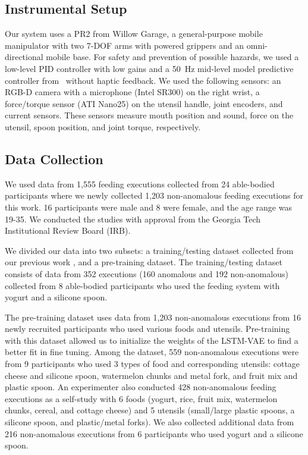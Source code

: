 \documentclass[letterpaper, 10 pt, conference]{ieeeconf}
\begin{document}
\subsection{Instrumental Setup}
Our system uses a PR2 from Willow Garage, a general-purpose mobile manipulator with two 7-DOF arms with powered grippers and an omni-directional mobile base. For safety and prevention of possible hazards, we used a low-level PID controller with low gains and a \SI{50}{\hertz} mid-level model predictive controller from~\cite{jain2013reaching} without haptic feedback. We used the following sensors: an RGB-D camera with a microphone (Intel SR300) on the right wrist, a force/torque sensor (ATI Nano25) on the utensil handle, joint encoders, and current sensors. These sensors measure mouth position and sound, force on the utensil, spoon position, and joint torque, respectively. 

\subsection{Data Collection}
We used data from 1,555 feeding executions collected from 24 able-bodied participants where we newly collected 1,203 non-anomalous feeding executions for this work. 16 participants were male and 8 were female, and the age range was 19-35. We conducted the studies with approval from the Georgia Tech Institutional Review Board (IRB).

We divided our data into two subsets: a training/testing dataset collected from our previous work \cite{park2017class}, and a pre-training dataset. The training/testing dataset consists of data from 352 executions (160 anomalous and 192 non-anomalous) collected from 8 able-bodied participants who used the feeding system with yogurt and a silicone spoon. 

The pre-training dataset uses data from 1,203 non-anomalous executions from 16 newly recruited participants who used various foods and utensils. Pre-training with this dataset allowed us to initialize the weights of the LSTM-VAE to find a better fit in fine tuning. Among the dataset, 559 non-anomalous executions were from 9 participants who used 3 types of food and corresponding utensils: cottage cheese and silicone spoon, watermelon chunks and metal fork, and fruit mix and plastic spoon. An experimenter also conducted 428 non-anomalous feeding executions as a self-study with 6 foods (yogurt, rice, fruit mix, watermelon chunks, cereal, and cottage cheese) and 5 utensils (small/large plastic spoons, a silicone spoon, and plastic/metal forks). We also collected additional data from 216 non-anomalous executions from 6 participants who used yogurt and a silicone spoon.
\end{document}
